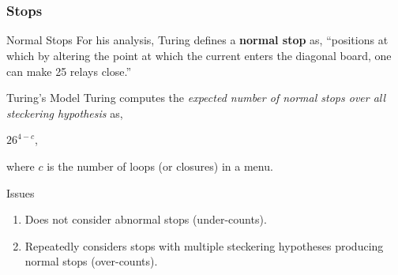 \documentclass[hyphens,aspectratio=169]{beamer}
\begin{document}





\part{}
\section{Stops}

\begin{frame}[fragile]{Normal Stops}
	For his analysis, Turing defines a \textbf{normal stop} as, ``positions at which by altering the point at which the current
	enters the diagonal board, one can make 25 relays close.''
\end{frame}

\begin{frame}[fragile]{Turing's Model}
	Turing computes the \emph{expected number of normal stops over all steckering hypothesis} as,
	\begin{center}
		$26^{4-c}$,
	\end{center}
	where $c$ is the number of loops (or closures) in a menu.
\end{frame}

\begin{frame}[fragile]{Issues}
	\begin{enumerate}
		\item Does not consider abnormal stops (under-counts).
		      \vspace{1em}
		\item Repeatedly considers stops with multiple steckering hypotheses producing normal stops (over-counts).
	\end{enumerate}
\end{frame}
\end{document}
